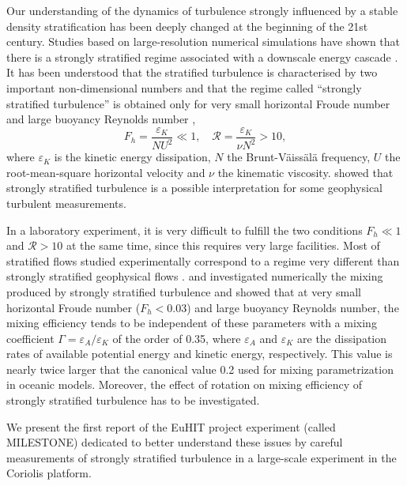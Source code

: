 \documentclass[a4paper, 12pt, times]{article}
\newcommand{\R}{\mathcal{R}}
\newcommand{\epsK}{\varepsilon_{\!\scriptscriptstyle K}}
\newcommand{\epsA}{\varepsilon_{\!\scriptscriptstyle A}}
\begin{document}
\noindent
Our understanding of the dynamics of turbulence strongly influenced by a stable
density stratification has been deeply changed at the beginning of the 21st
century.
%
Studies based on large-resolution numerical simulations have shown that there
is a strongly stratified regime associated with a downscale energy cascade
\cite[]{RileyDeBruynKops2003, Lindborg2006}.
%
It has been understood that the stratified turbulence is characterised by two
important non-dimensional numbers and that the regime called ``strongly
stratified turbulence'' is obtained only for very small horizontal Froude
number and large buoyancy Reynolds number \cite[]{Billant2001,
BrethouwerBillantLindborg2007},
\begin{equation}
 F_h = \frac{\epsK}{N U^2} \ll 1,\quad \R = \frac{\epsK}{\nu N^2} > 10,
\label{eq:FhR}
\end{equation}
where $\epsK$ is the kinetic energy dissipation, $N$ the
Brunt-V\"{a}iss\"{a}l\"{a} frequency, $U$ the root-mean-square horizontal
velocity and $\nu$ the kinematic viscosity.
%
\cite{RileyLindborg2008} showed that strongly stratified turbulence is a
possible interpretation for some geophysical turbulent measurements.

\noindent In a laboratory experiment, it is very difficult to fulfill the two conditions $F_h \ll 1$ and $\R > 10$ at the same time, since this requires very large
facilities.
%
Most of stratified flows studied experimentally
correspond to a regime very different than strongly stratified geophysical
flows \cite[see for example][]{PraudFinchamSommeria2005,
AugierBillantNegrettiChomaz2013, AugierBillantChomaz2015}.
%
\cite{BrethouwerLindborg2009} and \cite{Maffioli2016} investigated numerically
the mixing produced by strongly stratified turbulence and showed that at very
small horizontal Froude number ($F_h < 0.03$) and large buoyancy Reynolds
number, the mixing efficiency tends to be independent of these parameters with
a mixing coefficient $\Gamma = \epsA/\epsK$ of the order of 0.35, where $\epsA$
and $\epsK$ are the dissipation rates of available potential energy and kinetic
energy, respectively. This value is nearly twice larger that the canonical
value 0.2 used for mixing parametrization in oceanic models. Moreover, the
effect of rotation on mixing efficiency of strongly stratified
turbulence has to be investigated.

\noindent We present the first report of the EuHIT project experiment (called
MILESTONE) dedicated to better understand these issues by careful measurements
of strongly stratified turbulence in a large-scale experiment in the Coriolis
platform.
\end{document}
